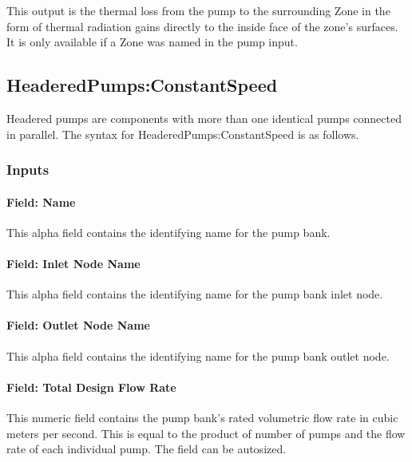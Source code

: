 This output is the thermal loss from the pump to the surrounding Zone in the form of thermal radiation gains directly to the inside face of the zone's surfaces. It is only available if a Zone was named in the pump input.

\subsection{HeaderedPumps:ConstantSpeed}\label{headeredpumpsconstantspeed}

Headered pumps are components with more than one identical pumps connected in parallel. The syntax for HeaderedPumps:ConstantSpeed is as follows.

\subsubsection{Inputs}\label{inputs-3-027}

\paragraph{Field: Name}\label{field-name-3-024}

This alpha field contains the identifying name for the pump bank.

\paragraph{Field: Inlet Node Name}\label{field-inlet-node-name-3-000}

This alpha field contains the identifying name for the pump bank inlet node.

\paragraph{Field: Outlet Node Name}\label{field-outlet-node-name-3-000}

This alpha field contains the identifying name for the pump bank outlet node.

\paragraph{Field: Total Design Flow Rate}\label{field-total-design-flow-rate}

This numeric field contains the pump bank's rated volumetric flow rate in cubic meters per second. This is equal to the product of number of pumps and the flow rate of each individual pump. The field can be autosized.

